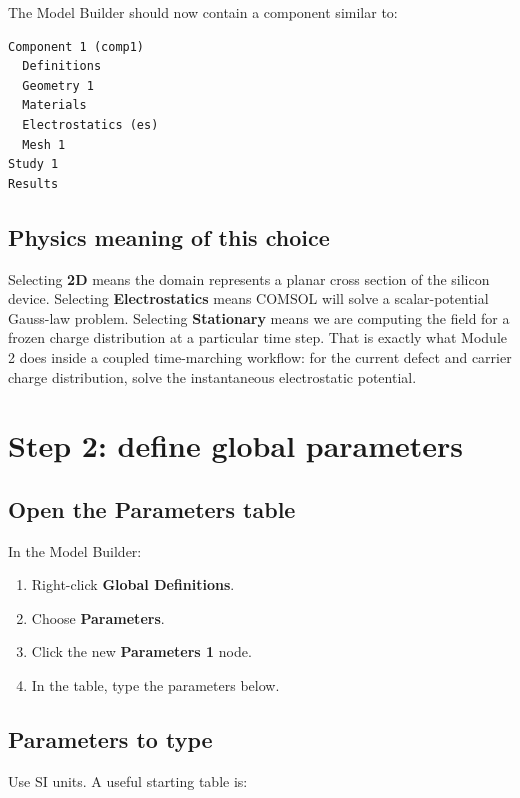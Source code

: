 \documentclass[11pt]{article}
\begin{document}
The Model Builder should now contain a component similar to:
\begin{verbatim}
Component 1 (comp1)
  Definitions
  Geometry 1
  Materials
  Electrostatics (es)
  Mesh 1
Study 1
Results
\end{verbatim}

\subsection{Physics meaning of this choice}

Selecting \textbf{2D} means the domain represents a planar cross section of the silicon device. Selecting \textbf{Electrostatics} means COMSOL will solve a scalar-potential Gauss-law problem. Selecting \textbf{Stationary} means we are computing the field for a frozen charge distribution at a particular time step. That is exactly what Module 2 does inside a coupled time-marching workflow: for the current defect and carrier charge distribution, solve the instantaneous electrostatic potential.

\section{Step 2: define global parameters}

\subsection{Open the Parameters table}

In the Model Builder:
\begin{enumerate}[leftmargin=2em]
\item Right-click \textbf{Global Definitions}.
\item Choose \textbf{Parameters}.
\item Click the new \textbf{Parameters 1} node.
\item In the table, type the parameters below.
\end{enumerate}

\subsection{Parameters to type}

Use SI units. A useful starting table is:
\end{document}

